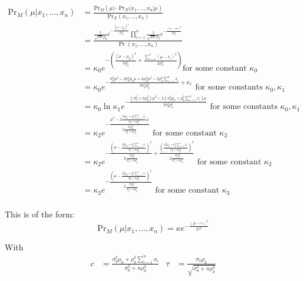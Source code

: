 \documentclass[10pt,\jkfside,a4paper]{article}
\begin{document}
\begin{enumerate}
\[
\begin{split}
\text{Pr}_M(\mu | x_1, \dots, x_n)
&= \frac{\text{Pr}_M\left(\mu)\cdot \text{Pr}_X(x_1, \dots,
x_n | \mu\right)}{\text{Pr}_X\left(x_1, \dots, x_n\right)} \\
&= \frac{\frac{1}{\sqrt{2\pi}\rho_0}e^{-\frac{\left( \mu - \mu_0 \right)^2}
{2\rho_0^2}}\prod^n_{i=1}\frac{1}{\sqrt{2\pi}\sigma_0}e^{-\frac{(x_i - \mu)
^2}{2\sigma_0^2}}}{\Pr\left(x_1, \dots, x_n\right)} \\
&= \kappa_0 e^{-\left( \frac{\left( \mu - \mu_0 \right)^2}{2\rho_0^2} +
\frac{\sum^n_{i=1}\left( \mu - x_i \right)^2}{2\sigma_0^2}\right)} \text{
for some constant }\kappa_0 \\
&= \kappa_0 e^{-\frac{\sigma_0^2\mu^2 -
2\sigma_0^2\mu_0\mu + n\rho_0^2\mu^2 - 2\rho_0^2\sum^n_{i=1}x_i}{2\sigma_0^2\rho_0^2} +
\kappa_1} \text{ for some constants } \kappa_0, \kappa_1 \\
&= \kappa_0 \ln \kappa_1 e^{-\frac{\left(\sigma_0^2 + n\rho_0^2\right)\mu^2 -
2\left( \sigma_0^2\mu_0 + \rho_0^2\sum^n_{i=1}x_i \right)
\mu}{2\sigma_0^2\rho_0^2}} \text{ for some constants } \kappa_0, \kappa_1 \\
&= \kappa_2 e^{-\frac{\mu^2 - 2\frac{\sigma_0^2\mu_0 +
\rho_0^2\sum^n_{i=1}x_i}{\sigma_0^2 +
n\rho_0^2}\mu}{2\frac{\sigma_0^2\rho_0^2}{\sigma_0^2 + n\rho_0^2}}}
\text{ for some constant } \kappa_2 \\
&= \kappa_2 e^{-\frac{\left( \mu - \frac{\sigma_0^2\mu_0 +
\rho_0^2\sum^n_{i=1}x_i}{\sigma_0^2 + n\rho_0^2} \right)
^2}{2\frac{\sigma_0^2\rho_0^2}{\sigma_0^2 + n\rho_0^2}} +
\frac{\left( \frac{\sigma_0^2\mu_0 +
\rho_0^2\sum^n_{i=1}x_i}{\sigma_0^2 + n\rho_0^2} \right)
^2}{2\frac{\sigma_0^2\rho_0^2}{\sigma_0^2 + n\rho_0^2}}}
\text{ for some constant } \kappa_2 \\
&= \kappa_3 e^{-\frac{\left( \mu - \frac{\sigma_0^2\mu_0 +
\rho_0^2\sum^n_{i=1}x_i}{\sigma_0^2 + n\rho_0^2} \right)
^2}{2\frac{\sigma_0^2\rho_0^2}{\sigma_0^2 + n\rho_0^2}}}
\text{ for some constant } \kappa_3 \\
\end{split}
\]

This is of the form:
\[
\text{Pr}_M(\mu | x_1, \dots, x_n) = \kappa e^{-\frac{(\mu - c)^2}{2\tau^2}}
\]

With
\begin{align*}
c &= \frac{\sigma_0^2\mu_0 +
\rho_0^2\sum^n_{i=1}x_i}{\sigma_0^2 + n\rho_0^2} & \tau &=
\frac{\sigma_0\rho_0}{\sqrt{\sigma_0^2 + n\rho_0^2}}
\end{align*}


\end{enumerate}
\end{document}

